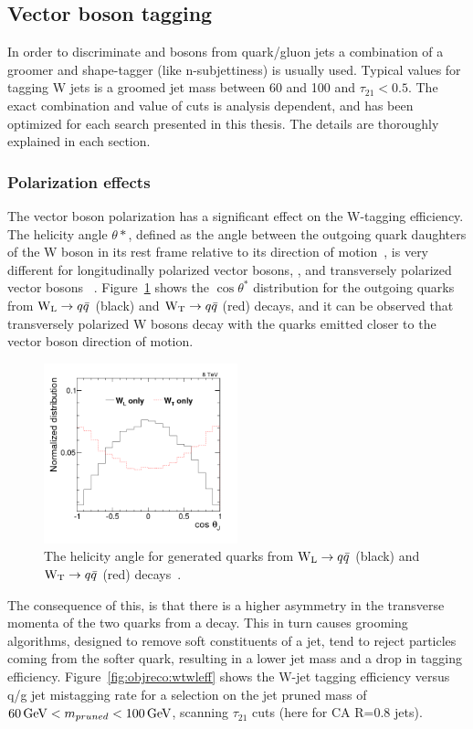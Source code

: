 \subsection{Vector boson tagging}
In order to discriminate \PW and \PZ bosons from quark/gluon jets a combination of a groomer and shape-tagger (like n-subjettiness) is usually used.
Typical values for tagging W jets is a groomed jet mass between 60 and 100 \GeV and $\tau_{21}<0.5$. The exact combination and value of cuts is analysis dependent, and has been optimized for each search presented in this thesis. The details are thoroughly explained in each section.

\subsubsection{Polarization effects}
\label{sec:objreco:pol}
The vector boson polarization has a significant effect on the W-tagging efficiency. The helicity angle $\theta*$, defined as the angle between the outgoing quark daughters of the W boson in its rest frame relative to its direction of motion~\cite{PhysRevD.86.095031}, is very different for longitudinally polarized vector bosons, \PWL, and transversely polarized vector bosons \PWT ~\cite{Khachatryan:2014vla}. Figure~\ref{fig:objreco:wtwlcostheta} shows the $\cos \theta^*$ distribution for the outgoing quarks from $\mathrm{W}_{\mathrm{L}} \rightarrow q \bar {q}$ (black) and $\mathrm{W}_{\mathrm{T}} \rightarrow q \bar{q}$ (red) decays, and it can be observed that transversely polarized W bosons decay with the quarks emitted closer to the vector boson direction of motion.
\begin{figure}[h!] 
    \centering 
    \includegraphics[width=0.5\textwidth]{figures/event_reconstruction/cosThetaJJ_GEN.png}
     \caption{The helicity angle for generated quarks from $\mathrm{W}_{\mathrm{L}}\rightarrow q\bar{q}$ (black) and $\mathrm{W}_{\mathrm{T}}\rightarrow q\bar{q}$ (red) decays~\cite{Khachatryan:2014vla}.}
     \label{fig:objreco:wtwlcostheta}
 \end{figure}
The consequence of this, is that there is a higher asymmetry in the transverse momenta of the two quarks from a \PWT decay. This in turn causes grooming algorithms, designed to remove soft constituents of a jet, tend to reject particles coming from the softer quark, resulting in a lower jet mass and a drop in tagging efficiency. Figure~\ref{fig:objreco:wtwleff} shows the W-jet tagging efficiency versus q/g jet mistagging rate for a selection on the jet pruned mass of $60 \,\text{Ge\hspace{-.08em}V} < m_{pruned} < 100 \,\text{Ge\hspace{-.08em}V}$, scanning $\tau_{21}$ cuts (here for CA R=0.8 jets).


